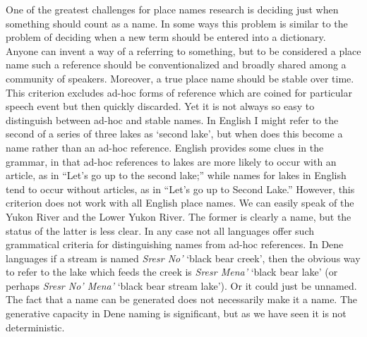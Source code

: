 One of the greatest challenges for place names research is deciding just when something should count as a name. In some ways this problem is similar to the problem of deciding when a new term should be entered into a dictionary. Anyone can invent a way of a referring to something, but to be considered a place name such a reference should be conventionalized and broadly shared among a community of speakers. Moreover, a true place name should be stable over time. This criterion excludes ad-hoc forms of reference which are coined for particular speech event but then quickly discarded. Yet it is not always so easy to distinguish between ad-hoc and stable names. In English I might refer to the second of a series of three lakes as ‘second lake’, but when does this become a name rather than an ad-hoc reference. English provides some clues in the grammar, in that ad-hoc references to lakes are more likely to occur with an article, as in “Let’s go up to the second lake;” while names for lakes in English tend to occur without articles, as in “Let’s go up to Second Lake.” However, this criterion does not work with all English place names. We can easily speak of the Yukon River and the Lower Yukon River. The former is clearly a name, but the status of the latter is less clear. In any case not all languages offer such grammatical criteria for distinguishing names from ad-hoc references. In Dene languages if a stream is named \textit{Sresr No’} ‘black bear creek’, then the obvious way to refer to the lake which feeds the creek is \textit{Sresr Mena’} ‘black bear lake’ (or perhaps \textit{Sresr No' Mena'} `black bear stream lake'). Or it could just be unnamed. The fact that a name can be generated does not necessarily make it a name. The generative capacity in Dene naming is significant, but as we have seen it is not deterministic.

